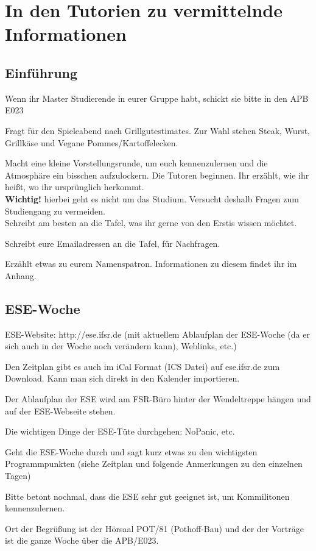 \documentclass[a4paper,12pt]{report}
\begin{document}
\chapter{In den Tutorien zu vermittelnde Informationen}

\section{Einführung}
\begin{itemize*}
\item Wenn ihr Master Studierende in eurer Gruppe habt, schickt sie bitte in den APB E023
\item Fragt für den Spieleabend nach Grillgutestimates. Zur Wahl stehen Steak, Wurst, Grillkäse und Vegane Pommes/Kartoffelecken.
\item Macht eine kleine Vorstellungsrunde, um euch kennenzulernen und die Atmosphäre ein bisschen aufzulockern.
Die Tutoren beginnen. Ihr erzählt, wie ihr heißt, wo ihr ursprünglich herkommt.\\
\textbf{Wichtig!} hierbei geht es nicht um das Studium. Versucht deshalb Fragen zum Studiengang zu vermeiden.\\
Schreibt am besten an die Tafel, was ihr gerne von den Erstis wissen möchtet.
\item Schreibt eure Emailadressen an die Tafel, für Nachfragen.
\item Erzählt etwas zu eurem Namenspatron. Informationen zu diesem findet ihr im Anhang.
\end{itemize*}

\section{ESE-Woche}
\begin{itemize*}
\item ESE-Website: http://ese.ifsr.de (mit aktuellem Ablaufplan der ESE-Woche (da er sich auch in der Woche noch verändern kann), Weblinks, etc.)
\item Den Zeitplan gibt es auch im iCal Format (ICS Datei) auf ese.ifsr.de zum Download.
Kann man sich direkt in den Kalender importieren.
\item Der Ablaufplan der ESE wird am FSR-Büro hinter der Wendeltreppe hängen und auf der ESE-Webseite stehen.
\item Die wichtigen Dinge der ESE-Tüte durchgehen: NoPanic, etc.
\item Geht die ESE-Woche durch und sagt kurz etwas zu den wichtigsten Programmpunkten (siehe Zeitplan und folgende Anmerkungen zu den einzelnen Tagen)
\item Bitte betont nochmal, dass die ESE sehr gut geeignet ist, um Kommilitonen kennenzulernen.
\end{itemize*}
Ort der Begrüßung ist der Hörsaal POT/81 (Pothoff-Bau) und der der Vorträge ist die ganze Woche über die APB/E023.
\end{document}
